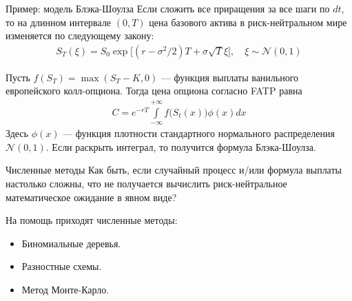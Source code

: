 \documentclass{beamer}
\begin{document}
\begin{frame}{Пример: модель Блэка-Шоулза}
\justify
Если сложить все приращения за все шаги по $dt$, то на длинном интервале $(0, T)$ цена базового актива в риск-нейтральном мире изменяется по следующему закону:
\begin{align*}
S_T(\xi) = S_0\exp{\Big[\left(r - \sigma^2/2\right)T + \sigma\sqrt{T}\xi\Big]}, \quad \xi \sim \mathcal{N}(0, 1)
\end{align*}

\justify
Пусть $f(S_T) = \max(S_T - K, 0)$ --- функция выплаты ванильного европейского колл-опциона. Тогда цена опциона согласно FATP равна
\begin{align*}
C = e^{-rT} \int\limits_{-\infty}^{+\infty}f\Big(S_t(x)\Big)\phi(x)dx
\end{align*}
Здесь $\phi(x)$ --- функция плотности стандартного нормального распределения $\mathcal{N}(0,1)$. Если раскрыть интеграл, то получится формула Блэка-Шоулза.
\end{frame}



\begin{frame}{Численные методы}
\justify
Как быть, если случайный процесс и/или формула выплаты настолько сложны, что не получается вычислить риск-нейтральное математическое ожидание в явном виде?

\justify
На помощь приходят численные методы:
\begin{itemize}
\item Биномиальные деревья.
\item Разностные схемы.
\item Метод Монте-Карло.
\end{itemize}
\end{frame}
\end{document}
